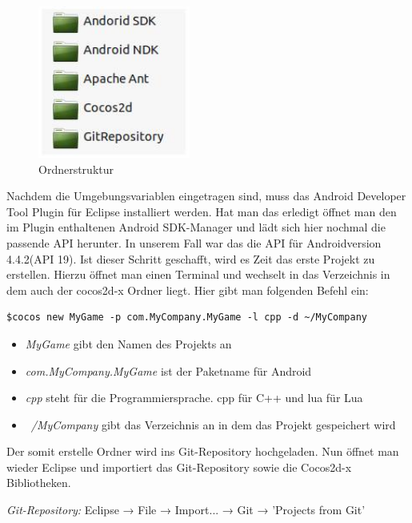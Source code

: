 \begin{figure}[H]
\centering
\includegraphics[width=5cm]{resources/Ordnerstruktur}
\caption{Ordnerstruktur}
\label{fig: Ordnerstruktur}
\end{figure}


\label{sec:2_IDE}

Nachdem die Umgebungsvariablen eingetragen sind, muss das Android Developer Tool Plugin für Eclipse installiert werden. Hat man das erledigt öffnet man den im Plugin enthaltenen Android SDK-Manager und lädt sich hier nochmal die passende API herunter. In unserem Fall war das die API für Androidversion 4.4.2(API 19). 
Ist dieser Schritt geschafft, wird es Zeit das erste Projekt zu erstellen.
Hierzu öffnet man einen Terminal und wechselt in das Verzeichnis in dem auch der cocos2d-x Ordner liegt. Hier gibt man folgenden Befehl ein:
	
\begin{lstlisting}[style=singleline]
	$cocos new MyGame -p com.MyCompany.MyGame -l cpp -d ~/MyCompany
\end{lstlisting}
		
\begin{itemize}
\item \textit{MyGame} gibt den Namen des Projekts an
\item \textit{com.MyCompany.MyGame} ist der Paketname für Android
\item \textit{cpp} steht für die Programmiersprache. cpp für C++ und lua für Lua
\item ~\textit{/MyCompany} gibt das Verzeichnis an in dem das Projekt gespeichert wird 
\end{itemize}

Der somit erstelle Ordner wird ins Git-Repository hochgeladen. 
Nun öffnet man wieder Eclipse und importiert das Git-Repository sowie die Cocos2d-x Bibliotheken. 

	\textit{Git-Repository:} Eclipse → File → Import... → Git → 'Projects from Git'

